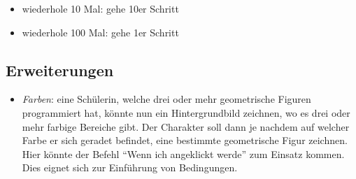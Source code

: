 \begin{itemize}
\item
  wiederhole 10 Mal: gehe 10er Schritt
\item
  wiederhole 100 Mal: gehe 1er Schritt
\end{itemize}

\subsection{Erweiterungen}\label{erweiterungen}

\begin{itemize}
\tightlist
\item
  \emph{Farben}: eine Schülerin, welche drei oder mehr geometrische
  Figuren programmiert hat, könnte nun ein Hintergrundbild zeichnen, wo
  es drei oder mehr farbige Bereiche gibt. Der Charakter soll dann je
  nachdem auf welcher Farbe er sich geradet befindet, eine bestimmte
  geometrische Figur zeichnen. Hier könnte der Befehl ``Wenn ich
  angeklickt werde'' zum Einsatz kommen. Dies eignet sich zur Einführung
  von Bedingungen.
\end{itemize}
